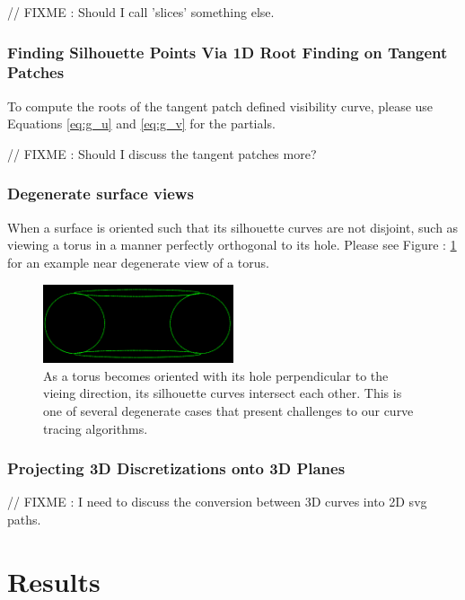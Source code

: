 \documentclass[12pt, letterpaper]{article}
\begin{document}
		// FIXME : Should I call 'slices' something else.

		\subsubsection{Finding Silhouette Points Via 1D Root Finding on Tangent Patches}

		To compute the roots of the tangent patch defined visibility curve, please use Equations \ref{eq:g_u} and \ref{eq:g_v} for the partials.

		// FIXME : Should I discuss the tangent patches more?

		\subsubsection{Degenerate surface views}

		When a surface is oriented such that its silhouette curves are not disjoint, such as viewing a torus in a manner perfectly orthogonal to its hole.
		Please see Figure : \ref{fig:degenerate_torus_orientation} for an example near degenerate view of a torus.

		\begin{figure}[h]
		\centering
		\includegraphics[width=0.5\textwidth]{torus_side_silhouettes}
		\caption{As a torus becomes oriented with its hole perpendicular to the vieing direction, its silhouette curves intersect each other. 
			This is one of several degenerate cases that present challenges to our curve tracing algorithms.}
		\label{fig:degenerate_torus_orientation}
		\end{figure}

		\subsubsection{Projecting 3D Discretizations onto 3D Planes}

		// FIXME : I need to discuss the conversion between 3D curves into 2D svg paths.

\section{Results}
\end{document}
